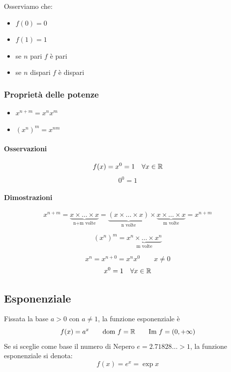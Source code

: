 \begin{figure}[bth]
\myfloatalign
{} 
\end{figure}
Osserviamo che:
\begin{itemize}
	\item $f(0)=0$
	\item $f(1)=1$
	\item se $n$ pari $f$ è pari
	\item se $n$ dispari $f$ è dispari
\end{itemize}

\subsubsection{Proprietà delle potenze}
\begin{itemize}
\item $x^{n+m}=x^n x^m$
\item $(x^n)^m=x^{nm}$
\end{itemize}

\paragraph{Osservazioni}
\[f(x)=x^0=1 \quad \forall x \in \mathbb{R}\]
\[0^0=1\]

\paragraph{Dimostrazioni}

\[x^{n+m}= \underbrace{x \times \dots \times x}_{\text{n+m volte}}=\underbrace{(x \times \dots \times x)}_{\text{n volte}}\times \underbrace{x \times \dots \times x}_{\text{m volte}}=x^{n+m}\]

\[(x^{n})^m= \underbrace{x^n \times \dots \times x^n}_{\text{m volte}}\]

\[x^n=x^{n+0}=x^n x^0 \qquad x\neq 0\]
\[x^0 = 1 \quad \forall x \in \mathbb{R}\]

\subsection{Esponenziale}
Fissata la base $a>0$ con $a \neq 1$, la funzione esponenziale è
\[f(x)=a^x \qquad \text{dom } f = \mathbb{R} \qquad \text{Im } f = (0,+\infty)\]
Se si sceglie come base il numero di Nepero $e=2.71828\dots > 1$, la funzione esponenziale si denota:
\[f(x)=e^x=\exp x\]

